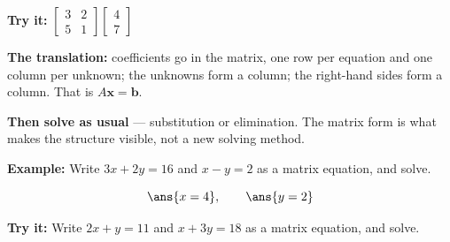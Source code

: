 \documentclass[12pt]{article}
\begin{document}
\begin{tryitbox}
\textbf{Try it:} \quad $\begin{bmatrix} 3 & 2 \\ 5 & 1 \end{bmatrix}\begin{bmatrix} 4 \\ 7 \end{bmatrix}$\\[2pt]
\end{tryitbox}


\begin{formulabox}
\textbf{The translation:} coefficients go in the matrix, one row per equation and one column per unknown; the unknowns form a column; the right-hand sides form a column. That is $A\mathbf{x} = \mathbf{b}$.\par
\textbf{Then solve as usual} --- substitution or elimination. The matrix form is what makes the structure visible, not a new solving method.
\end{formulabox}

\begin{examplebox}
\textbf{Example:} \quad Write $3x + 2y = 16$ and $x - y = 2$ as a matrix equation, and solve.

\[ \ans{x = 4}, \qquad \ans{y = 2} \]
\end{examplebox}

\begin{tryitbox}
\textbf{Try it:} \quad Write $2x + y = 11$ and $x + 3y = 18$ as a matrix equation, and solve.\\[2pt]
\end{tryitbox}
\end{document}
